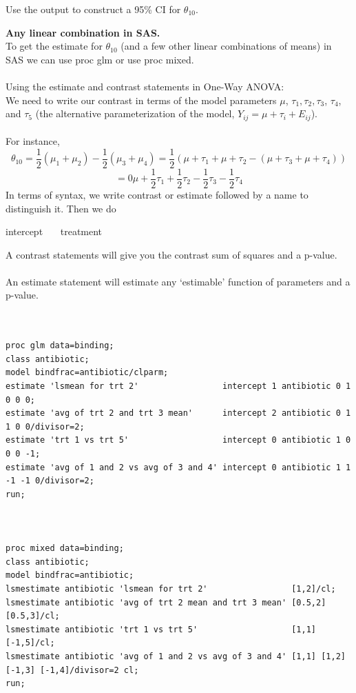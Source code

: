 Use the output to construct a 95\% CI for $\theta_{10}$.

\newpage
\textbf{Any linear combination in SAS.}\\
To get the estimate for $\theta_{10}$ (and a few other linear combinations of means) in SAS we can use proc glm or use proc mixed.\\~\\

Using the estimate and contrast statements in One-Way ANOVA:\\
We need to write our contrast in terms of the model parameters $\mu$, $\tau_1, \tau_2,\tau_3$, $\tau_4$, and $\tau_5$ (the alternative parameterization of the model, $Y_{ij}=\mu+\tau_i+E_{ij}$). \\~\\

For instance, 
$$\theta_{10}=\frac{1}{2}(\mu_1+\mu_2)-\frac{1}{2}(\mu_3+\mu_4)=\frac{1}{2}(\mu+\tau_1+\mu+\tau_2-(\mu+\tau_3+\mu+\tau_4))$$
$$=0\mu+\frac{1}{2}\tau_1+\frac{1}{2}\tau_2-\frac{1}{2}\tau_3-\frac{1}{2}\tau_4$$
In terms of syntax, we write contrast or estimate followed by a name to distinguish it.  Then we do
\begin{center}
intercept ~~~treatment ~~~~~~~~~
\end{center}
A contrast statements will give you the contrast sum of squares and a p-value.\\~\\
An estimate statement will estimate any `estimable' function of parameters and a p-value. \\~\\~\\



\begin{small}
\begin{verbatim}
proc glm data=binding;
class antibiotic;
model bindfrac=antibiotic/clparm;
estimate 'lsmean for trt 2'                 intercept 1 antibiotic 0 1 0 0 0;
estimate 'avg of trt 2 and trt 3 mean'      intercept 2 antibiotic 0 1 1 0 0/divisor=2;
estimate 'trt 1 vs trt 5'                   intercept 0 antibiotic 1 0 0 0 -1;
estimate 'avg of 1 and 2 vs avg of 3 and 4' intercept 0 antibiotic 1 1 -1 -1 0/divisor=2;
run;



proc mixed data=binding;
class antibiotic;
model bindfrac=antibiotic;
lsmestimate antibiotic 'lsmean for trt 2'                 [1,2]/cl;
lsmestimate antibiotic 'avg of trt 2 mean and trt 3 mean' [0.5,2] [0.5,3]/cl;
lsmestimate antibiotic 'trt 1 vs trt 5'                   [1,1] [-1,5]/cl;
lsmestimate antibiotic 'avg of 1 and 2 vs avg of 3 and 4' [1,1] [1,2] [-1,3] [-1,4]/divisor=2 cl;
run;
\end{verbatim}
\end{small}

